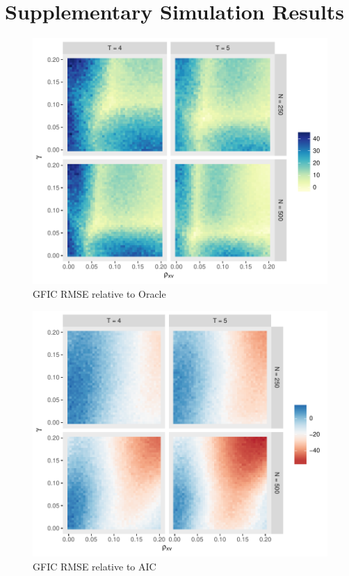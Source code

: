 \section{Supplementary Simulation Results}
\begin{figure}
\centering
\includegraphics[scale = 0.8]{./simulations/DynamicPanel/results/Dpanel_GFIC_RMSE_rel_oracle}
\caption{GFIC RMSE relative to Oracle}
\end{figure}
\begin{figure}
\centering
\includegraphics[scale = 0.8]{./simulations/DynamicPanel/results/Dpanel_GFIC_RMSE_rel_AIC}
\caption{GFIC RMSE relative to AIC}
\end{figure}
